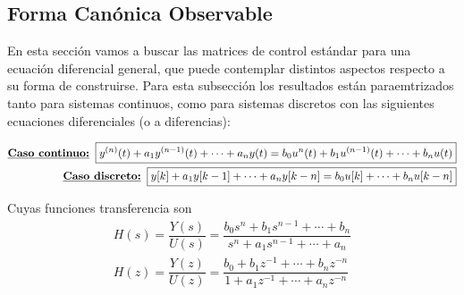 \subsection{Forma Canónica Observable}
En esta sección vamos a buscar las matrices de control estándar para una ecuación
diferencial general, que puede contemplar distintos aspectos respecto a su forma de construirse. 
Para esta subsección los resultados están paraemtrizados tanto para sistemas continuos, como para sistemas discretos
con las siguientes ecuaciones diferenciales (o a diferencias): 


\begin{equation*}
    \begin{split}
        \text{\textbf{\underline{Caso continuo:}}} \; \; \boxed{y^{(n)}(t) + a_1 y^{(n-1)}(t) + \cdots + a_n y(t) = b_0 u^{n}(t) + b_1 u^{(n-1)}(t) + \cdots + b_n u(t)}      \\
        \text{\textbf{\underline{Caso discreto:}}} \; \; \boxed{y[k] + a_1 y[k-1] + \cdots + a_n y[k-n] = b_0 u[k] + \cdots + b_n u[k-n]}  \\
    \end{split}
\end{equation*}

Cuyas funciones transferencia son
\begin{equation*}
    \begin{split}
        H(s) = \dfrac{Y(s)}{U(s)} = \dfrac{b_0 s^n + b_1 s^{n-1} + \cdots + b_n}{s^n + a_1 s^{n-1} + \cdots + a_n} \\
        H(z) = \dfrac{Y(z)}{U(z)} = \dfrac{b_0 + b_1 z^{-1} + \cdots + b_n z^{-n}}{1 + a_1 z^{-1} + \cdots + a_n z^{-n}} \\
    \end{split} 
\end{equation*}

